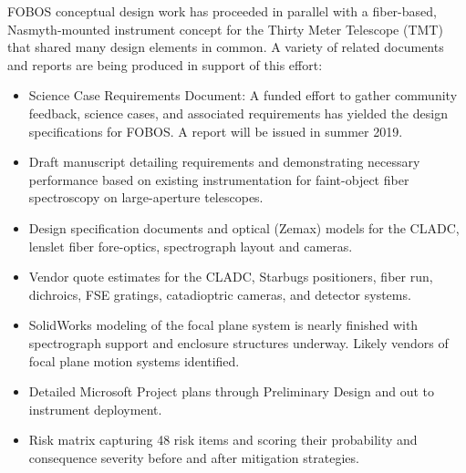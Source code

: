 \documentclass[oneside,11pt]{amsart}
\begin{document}
FOBOS conceptual design work has proceeded in parallel with a fiber-based, Nasmyth-mounted instrument concept for the Thirty Meter Telescope (TMT) that shared many design elements in common.  A variety of related documents and reports are being produced in support of this effort:

\begin{itemize}
	\item Science Case Requirements Document: A funded effort to gather community feedback, science cases, and associated requirements has yielded the design specifications for FOBOS.  A report will be issued in summer 2019.

	\item Draft manuscript detailing requirements and demonstrating necessary performance based on existing instrumentation for faint-object fiber spectroscopy on large-aperture telescopes.

	\item Design specification documents and optical (Zemax) models for the CLADC, lenslet fiber fore-optics, spectrograph layout and cameras.

	\item Vendor quote estimates for the CLADC, Starbugs positioners, fiber run, dichroics, FSE gratings, catadioptric cameras, and detector systems.

	\item SolidWorks modeling of the focal plane system is nearly finished with spectrograph support and enclosure structures underway.  Likely vendors of focal plane motion systems identified.

	\item Detailed Microsoft Project plans through Preliminary Design and out to instrument deployment.  

	\item Risk matrix capturing 48 risk items and scoring their probability and consequence severity before and after mitigation strategies.

\end{itemize}
\end{document}

